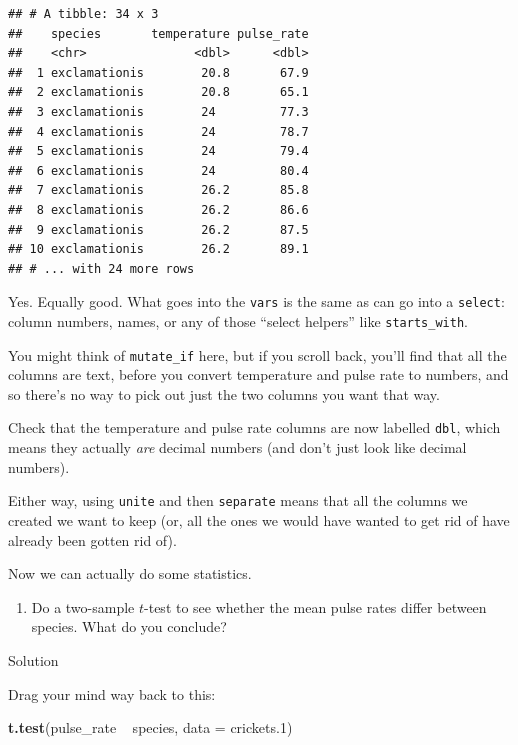 \documentclass[]{tufte-book}
\newenvironment{Shaded}{}{}
\newcommand{\DataTypeTok}[1]{\textcolor[rgb]{0.56,0.13,0.00}{#1}}
\newcommand{\FloatTok}[1]{\textcolor[rgb]{0.25,0.63,0.44}{#1}}
\newcommand{\KeywordTok}[1]{\textcolor[rgb]{0.00,0.44,0.13}{\textbf{#1}}}
\newcommand{\NormalTok}[1]{#1}
\newcommand{\OperatorTok}[1]{\textcolor[rgb]{0.40,0.40,0.40}{#1}}
\newcommand{\StringTok}[1]{\textcolor[rgb]{0.25,0.44,0.63}{#1}}
\providecommand{\tightlist}{%
  \setlength{\itemsep}{0pt}\setlength{\parskip}{0pt}}
\theoremstyle{definition}
\theoremstyle{definition}
\theoremstyle{definition}
\theoremstyle{remark}
\begin{document}
\begin{verbatim}
## # A tibble: 34 x 3
##    species       temperature pulse_rate
##    <chr>               <dbl>      <dbl>
##  1 exclamationis        20.8       67.9
##  2 exclamationis        20.8       65.1
##  3 exclamationis        24         77.3
##  4 exclamationis        24         78.7
##  5 exclamationis        24         79.4
##  6 exclamationis        24         80.4
##  7 exclamationis        26.2       85.8
##  8 exclamationis        26.2       86.6
##  9 exclamationis        26.2       87.5
## 10 exclamationis        26.2       89.1
## # ... with 24 more rows
\end{verbatim}

Yes. Equally good. What goes into the \texttt{vars} is the same as can
go into a \texttt{select}: column numbers, names, or any of those
``select helpers'' like \texttt{starts\_with}.

You might think of \texttt{mutate\_if} here, but if you scroll back,
you'll find that all the columns are text, before you convert
temperature and pulse rate to numbers, and so there's no way to pick out
just the two columns you want that way.

Check that the temperature and pulse rate columns are now labelled
\texttt{dbl}, which means they actually \emph{are} decimal numbers (and
don't just look like decimal numbers).

Either way, using \texttt{unite} and then \texttt{separate} means that
all the columns we created we want to keep (or, all the ones we would
have wanted to get rid of have already been gotten rid of).

Now we can actually do some statistics.

\begin{enumerate}
\def\labelenumi{(\alph{enumi})}
\setcounter{enumi}{5}
\tightlist
\item
  Do a two-sample \(t\)-test to see whether the mean pulse rates differ
  between species. What do you conclude?
\end{enumerate}

Solution

Drag your mind way back to this:

\begin{Shaded}
\begin{Highlighting}[]
\KeywordTok{t.test}\NormalTok{(pulse_rate }\OperatorTok{~}\StringTok{ }\NormalTok{species, }\DataTypeTok{data =}\NormalTok{ crickets}\FloatTok{.1}\NormalTok{)}
\end{Highlighting}
\end{Shaded}
\end{document}
